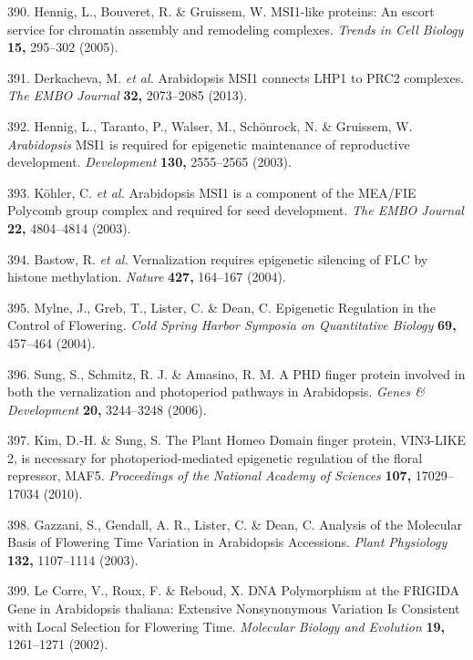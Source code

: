 \documentclass[12pt,]{book}
\begin{document}
\hypertarget{ref-hennig_msi1_like_2005}{}
390. Hennig, L., Bouveret, R. \& Gruissem, W. MSI1-like proteins: An
escort service for chromatin assembly and remodeling complexes.
\emph{Trends in Cell Biology} \textbf{15,} 295--302 (2005).

\hypertarget{ref-derkacheva_arabidopsis_2013}{}
391. Derkacheva, M. \emph{et al.} Arabidopsis MSI1 connects LHP1 to PRC2
complexes. \emph{The EMBO Journal} \textbf{32,} 2073--2085 (2013).

\hypertarget{ref-hennig_arabidopsis_2003}{}
392. Hennig, L., Taranto, P., Walser, M., Schönrock, N. \& Gruissem, W.
\emph{Arabidopsis} MSI1 is required for epigenetic maintenance of
reproductive development. \emph{Development} \textbf{130,} 2555--2565
(2003).

\hypertarget{ref-kohler_arabidopsis_2003}{}
393. Köhler, C. \emph{et al.} Arabidopsis MSI1 is a component of the
MEA/FIE Polycomb group complex and required for seed development.
\emph{The EMBO Journal} \textbf{22,} 4804--4814 (2003).

\hypertarget{ref-bastow_vernalization_2004}{}
394. Bastow, R. \emph{et al.} Vernalization requires epigenetic
silencing of FLC by histone methylation. \emph{Nature} \textbf{427,}
164--167 (2004).

\hypertarget{ref-mylne_epigenetic_2004}{}
395. Mylne, J., Greb, T., Lister, C. \& Dean, C. Epigenetic Regulation
in the Control of Flowering. \emph{Cold Spring Harbor Symposia on
Quantitative Biology} \textbf{69,} 457--464 (2004).

\hypertarget{ref-sung_phd_2006}{}
396. Sung, S., Schmitz, R. J. \& Amasino, R. M. A PHD finger protein
involved in both the vernalization and photoperiod pathways in
Arabidopsis. \emph{Genes \& Development} \textbf{20,} 3244--3248 (2006).

\hypertarget{ref-kim_plant_2010}{}
397. Kim, D.-H. \& Sung, S. The Plant Homeo Domain finger protein,
VIN3-LIKE 2, is necessary for photoperiod-mediated epigenetic regulation
of the floral repressor, MAF5. \emph{Proceedings of the National Academy
of Sciences} \textbf{107,} 17029--17034 (2010).

\hypertarget{ref-gazzani_analysis_2003}{}
398. Gazzani, S., Gendall, A. R., Lister, C. \& Dean, C. Analysis of the
Molecular Basis of Flowering Time Variation in Arabidopsis Accessions.
\emph{Plant Physiology} \textbf{132,} 1107--1114 (2003).

\hypertarget{ref-le_corre_dna_2002}{}
399. Le Corre, V., Roux, F. \& Reboud, X. DNA Polymorphism at the
FRIGIDA Gene in Arabidopsis thaliana: Extensive Nonsynonymous Variation
Is Consistent with Local Selection for Flowering Time. \emph{Molecular
Biology and Evolution} \textbf{19,} 1261--1271 (2002).
\end{document}
